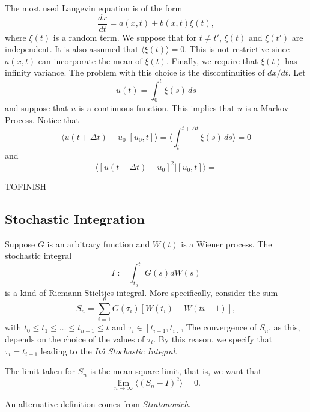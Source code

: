 The most used Langevin equation is of the form
\[
\frac{dx}{dt} = a(x,t) + b(x,t) \xi(t),    
\]
where $\xi(t)$ is a random term.
We suppose that for $t \neq t'$, $\xi(t)$ and $\xi(t')$ are independent.
It is also assumed that $\langle \xi(t) \rangle = 0$.
This is not restrictive since $a(x,t)$ can incorporate the mean of $\xi(t)$.
Finally, we require that $\xi(t)$ has infinity variance.
The problem with this choice is the discontinuities of $dx/dt$.
Let 
\[
u(t) = \int_0^t  \xi(s) \, ds 
\]
and suppose that $u$ is a continuous function. 
This implies that $u$ is a Markov Process.
Notice that 
\[
\langle u(t + \Delta t) - u_0 | [u_0, t] \rangle = \langle \int_t^{t + \Delta t} \xi(s) \, ds \rangle = 0
\]
and 
\[
\langle {[u(t + \Delta t) - u_0]}^2 | [u_0, t] \rangle =  
\]

TOFINISH

\subsection{Stochastic Integration}

Suppose $G$ is an arbitrary function and $W(t)$ is a Wiener process.
The stochastic integral
\[
I := \int_{t_0}^t G(s) dW(s)    
\] 
is a kind of Riemann-Stieltjes integral. 
More specifically, consider the sum
\[
S_n = \sum_{i=1}^n G(\tau_i)[W(t_i) - W(t{i-1})], 
\]
with $t_0 \le t_1 \le \dots \le t_{n-1} \le t$ and $\tau_i \in [t_{i-1}, t_i]$,
The convergence of $S_n$, as this, depends on the choice of the values of $\tau_i$.
By this reason, we specify that $\tau_i = t_{i-1}$ leading to the {\em Itô Stochastic Integral}.

\begin{remark}
    The limit taken for $S_n$ is the mean square limit, that is, we want that 
    \[
    \lim_{n \to \infty} \langle {(S_n - I)}^2 \rangle = 0.
    \]
\end{remark}

An alternative definition comes from {\em Stratonovich}.
